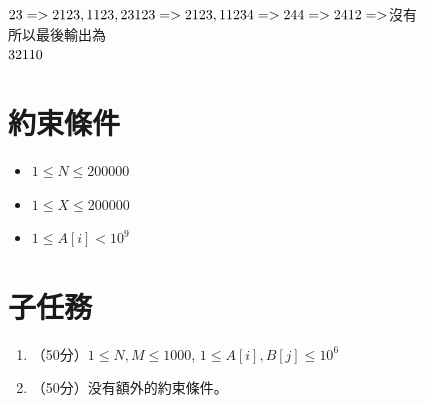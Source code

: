 \documentclass[18pt]{article}
\begin{document}
    $23 => 2123, 1123, 23\\
    123 => 2123, 1123\\
    4 => 24\\
    4 => 24\\
    12 => $沒有\\
    
    所以最後輸出為\\
    $3\\
    2\\
    1\\
    1\\
    0\\$
        
    \section*{約束條件}
    \begin{itemize}
        \item $1 \le N \le 200000$
        \item $1 \le X \le 200000$
        \item $1 \le A[i] < 10^{9}$
    \end{itemize}

    \section*{子任務}
    \begin{enumerate}
        \item （50分）$1 \le N, M \le 1000$, 
                     $1 \le A[i], B[j] \le 10^{6}$
        \item （50分）没有額外的約束條件。
    \end{enumerate}
\end{document}
